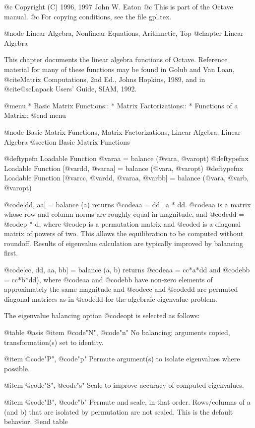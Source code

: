@c Copyright (C) 1996, 1997 John W. Eaton
@c This is part of the Octave manual.
@c For copying conditions, see the file gpl.tex.

@node Linear Algebra, Nonlinear Equations, Arithmetic, Top
@chapter Linear Algebra

This chapter documents the linear algebra functions of Octave.
Reference material for many of these functions may be found in
Golub and Van Loan, @cite{Matrix Computations, 2nd Ed.}, Johns Hopkins,
1989, and in @cite{@sc{Lapack} Users' Guide}, SIAM, 1992.

@menu
* Basic Matrix Functions::      
* Matrix Factorizations::       
* Functions of a Matrix::       
@end menu

@node Basic Matrix Functions, Matrix Factorizations, Linear Algebra, Linear Algebra
@section Basic Matrix Functions

@deftypefn {Loadable Function} {@var{aa} =} balance (@var{a}, @var{opt})
@deftypefnx {Loadable Function} {[@var{dd}, @var{aa}] =} balance (@var{a}, @var{opt})
@deftypefnx {Loadable Function} {[@var{cc}, @var{dd}, @var{aa}, @var{bb]} =} balance (@var{a}, @var{b}, @var{opt})

@code{[dd, aa] = balance (a)} returns @code{aa = dd \ a * dd}.
@code{aa} is a matrix whose row and column norms are roughly equal in
magnitude, and @code{dd} = @code{p * d}, where @code{p} is a permutation
matrix and @code{d} is a diagonal matrix of powers of two.  This allows
the equilibration to be computed without roundoff.  Results of
eigenvalue calculation are typically improved by balancing first.

@code{[cc, dd, aa, bb] = balance (a, b)} returns @code{aa = cc*a*dd} and
@code{bb = cc*b*dd)}, where @code{aa} and @code{bb} have non-zero
elements of approximately the same magnitude and @code{cc} and @code{dd}
are permuted diagonal matrices as in @code{dd} for the algebraic
eigenvalue problem.

The eigenvalue balancing option @code{opt} is selected as follows:

@table @asis
@item @code{"N"}, @code{"n"}
No balancing; arguments copied, transformation(s) set to identity.

@item @code{"P"}, @code{"p"}
Permute argument(s) to isolate eigenvalues where possible.

@item @code{"S"}, @code{"s"}
Scale to improve accuracy of computed eigenvalues.

@item @code{"B"}, @code{"b"}
Permute and scale, in that order. Rows/columns of a (and b)
that are isolated by permutation are not scaled.  This is the default
behavior.
@end table

